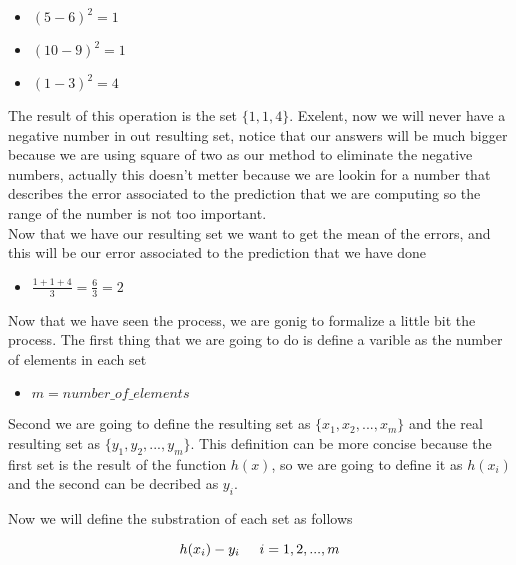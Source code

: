 \documentclass[12pt,journal]{IEEEtran}
\begin{document}
    \begin{itemize}
        \item $(5-6)^2 = 1$
        \item $(10-9)^2 = 1$
        \item $(1-3)^2 = 4$\\
    \end{itemize}

    The result of this operation is the set $\{1,1,4\}$. Exelent, now we will
    never have a negative number in out resulting set, notice that our
    answers will be much bigger because we are using square of two as our
    method to eliminate the negative numbers, actually this doesn't metter
    because we are lookin for a number that describes the error associated to
    the prediction that we are computing so the range of the number is not too
    important.\\

    Now that we have our resulting set we want to get the mean of the errors,
    and this will be our error associated to the prediction that we have done\\

    \begin{itemize}
        \item $\frac{1+1+4}{3} = \frac{6}{3} = 2$ \\
    \end{itemize}

    Now that we have seen the process, we are gonig to formalize a little bit
    the process. The first thing that we are going to do is define a varible as
    the number of elements in each set


    \begin{itemize}
        \item $m = number\_of\_elements$
    \end{itemize}

    Second we are going to define the resulting set as $\{x_1,x_2, ... , x_m\}$
    and the real resulting set as $\{y_1,y_2, ... , y_m\}$. This definition can
    be more concise because the first set is the result of the function $h(x)$,
    so we are going to define it as $h(x_i)$ and the second can be decribed as
    $y_i$.

    Now we will define the substration of each set as follows

    \begin{equation}
        h(x_i) - y_i \hspace{0.5cm} i=1, 2, ..., m
    \end{equation}
\end{document}
